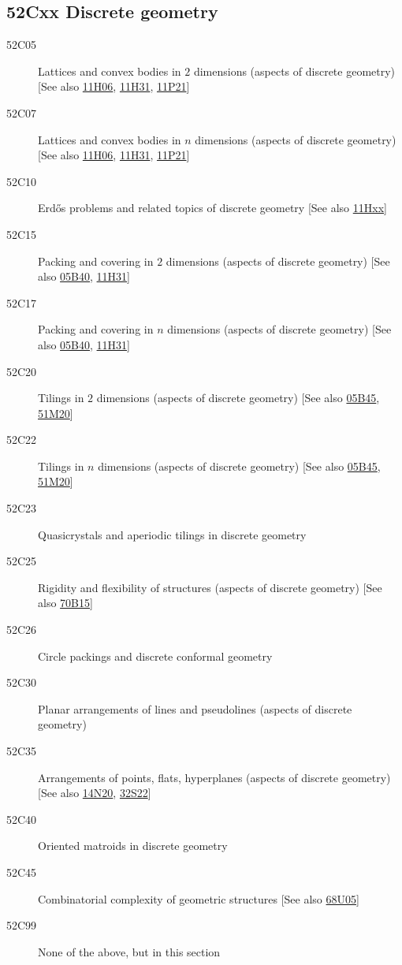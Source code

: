 \subsection*{52Cxx  Discrete geometry }\label{52Cxx}
\begin{description}  
\item [52C05]\label{52C05} Lattices and convex bodies in $2$ dimensions (aspects of discrete geometry) [See also \hyperref[11H06]{11H06}, \hyperref[11H31]{11H31}, \hyperref[11P21]{11P21}]
\item [52C07]\label{52C07} Lattices and convex bodies in $n$ dimensions (aspects of discrete geometry) [See also \hyperref[11H06]{11H06}, \hyperref[11H31]{11H31}, \hyperref[11P21]{11P21}]
\item [52C10]\label{52C10} Erd\H{o}s problems and related topics of discrete geometry [See also \hyperref[11Hxx]{11Hxx}]
\item [52C15]\label{52C15} Packing and covering in $2$ dimensions (aspects of discrete geometry) [See also \hyperref[05B40]{05B40}, \hyperref[11H31]{11H31}]
\item [52C17]\label{52C17} Packing and covering in $n$ dimensions (aspects of discrete geometry) [See also \hyperref[05B40]{05B40}, \hyperref[11H31]{11H31}]
\item [52C20]\label{52C20} Tilings in $2$ dimensions (aspects of discrete geometry) [See also \hyperref[05B45]{05B45}, \hyperref[51M20]{51M20}]
\item [52C22]\label{52C22} Tilings in $n$ dimensions (aspects of discrete geometry) [See also \hyperref[05B45]{05B45}, \hyperref[51M20]{51M20}]
\item [52C23]\label{52C23} Quasicrystals and aperiodic tilings in discrete geometry
\item [52C25]\label{52C25} Rigidity and flexibility of structures (aspects of discrete geometry) [See also \hyperref[70B15]{70B15}]
\item [52C26]\label{52C26} Circle packings and discrete conformal geometry
\item [52C30]\label{52C30} Planar arrangements of lines and pseudolines (aspects of discrete geometry)
\item [52C35]\label{52C35} Arrangements of points, flats, hyperplanes (aspects of discrete geometry) [See also \hyperref[14N20]{14N20}, \hyperref[32S22]{32S22}]
\item [52C40]\label{52C40} Oriented matroids in discrete geometry
\item [52C45]\label{52C45} Combinatorial complexity of geometric structures [See also \hyperref[68U05]{68U05}]
\item [52C99]\label{52C99} None of the above, but in this section
\end{description}
